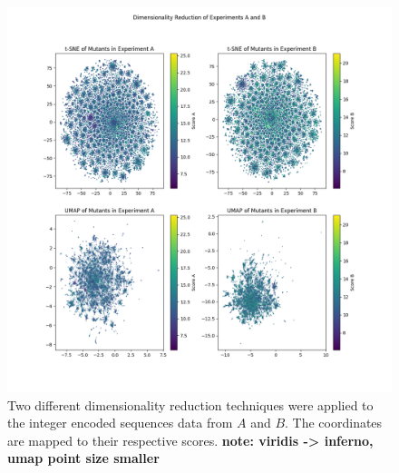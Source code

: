 \documentclass[16pt]{book}
\begin{document}
\begin{figure}
	\includegraphics[width=\textwidth]{img/dimred-plt.png}
	\caption{\label{dimredplt} Two different dimensionality reduction techniques were applied to the integer encoded sequences data from $A$ and $B$.
	The coordinates are mapped to their respective scores. \textbf{note: viridis -> inferno, umap point size smaller}}
\end{figure}
\end{document}
